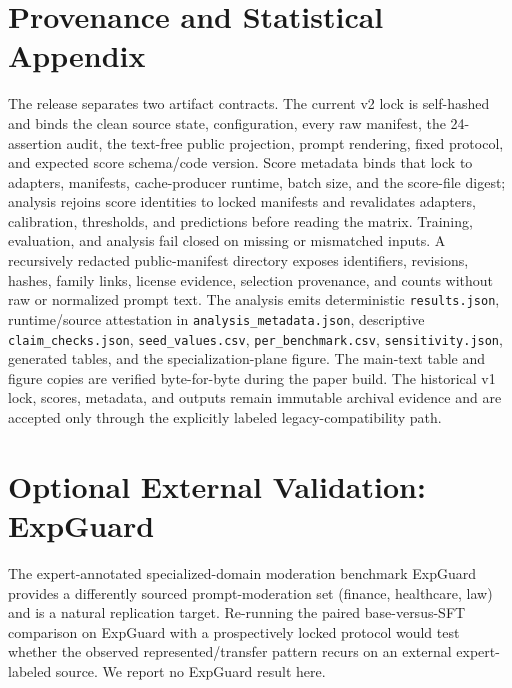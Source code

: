 \documentclass[11pt]{article}
\begin{document}
\appendix

\section{Provenance and Statistical Appendix}
\label{app:provenance}

The release separates two artifact contracts. The current v2 lock is self-hashed and binds the clean source state, configuration, every raw manifest, the 24-assertion audit, the text-free public projection, prompt rendering, fixed protocol, and expected score schema/code version. Score metadata binds that lock to adapters, manifests, cache-producer runtime, batch size, and the score-file digest; analysis rejoins score identities to locked manifests and revalidates adapters, calibration, thresholds, and predictions before reading the matrix. Training, evaluation, and analysis fail closed on missing or mismatched inputs. A recursively redacted public-manifest directory exposes identifiers, revisions, hashes, family links, license evidence, selection provenance, and counts without raw or normalized prompt text. The analysis emits deterministic \texttt{results.json}, runtime/source attestation in \texttt{analysis\_metadata.json}, descriptive \texttt{claim\_checks.json}, \texttt{seed\_values.csv}, \texttt{per\_benchmark.csv}, \texttt{sensitivity.json}, generated tables, and the specialization-plane figure. The main-text table and figure copies are verified byte-for-byte during the paper build. The historical v1 lock, scores, metadata, and outputs remain immutable archival evidence and are accepted only through the explicitly labeled legacy-compatibility path.

\begin{table}[!htbp]
\centering
\scriptsize
\setlength{\tabcolsep}{2.5pt}
\caption{Observed represented-source and transfer macro-AP changes for every clean-v2 SFT seed. This table is generated from the same validated score matrix as .}
\label{tab:seed-values}

\end{table}
\FloatBarrier

\section{Optional External Validation: ExpGuard}
\label{app:external}

The expert-annotated specialized-domain moderation benchmark ExpGuard \cite{expguard2026} provides a differently sourced prompt-moderation set (finance, healthcare, law) and is a natural replication target. Re-running the paired base-versus-SFT comparison on ExpGuard with a prospectively locked protocol would test whether the observed represented/transfer pattern recurs on an external expert-labeled source. We report no ExpGuard result here.

{\scriptsize


}
\end{document}

